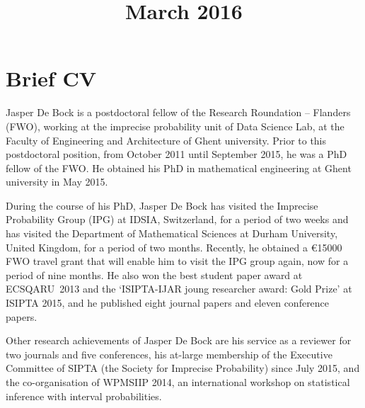 \documentclass[11pt,a4paper,roman]{moderncv}
\title{March 2016}  %
\begin{document}
\renewcommand*{\cventry}[6]{%
  \cvline{#1}{%
    {\scshape#2}%
    \ifx#3\else{, {\slshape#3}}\fi%
    \ifx#4\else{, #4}\fi%
    \ifx#5\else{, #5}\fi%
    .%
    \ifx#6\else{\newline{}\begin{minipage}[t]{\linewidth}\small#6\end{minipage}}\fi
}}%


\maketitle

\vspace{-55pt}

\section{Brief CV}
\vspace{4pt}

Jasper De Bock is a postdoctoral fellow of the Research Roundation -- Flanders (FWO), working at the imprecise probability unit of Data Science Lab, at the Faculty of Engineering and Architecture of Ghent university. Prior to this postdoctoral position, from October 2011 until September 2015, he was a PhD fellow of the FWO. He obtained his PhD in mathematical engineering at Ghent university in May 2015.

\hspace{17pt}During the course of his PhD, Jasper De Bock has visited the Imprecise Probability Group (IPG) at IDSIA, Switzerland, for a period of two weeks and has visited the Department of Mathematical Sciences at Durham University, United Kingdom, for a period of two months. Recently, he obtained a \euro{}15000 FWO travel grant that will enable him to visit the IPG group again, now for a period of nine months. He also won the best student paper award at ECSQARU~2013 and the `ISIPTA-IJAR joung researcher award: Gold Prize' at ISIPTA 2015, and he published eight journal papers and eleven conference papers.

\hspace{17pt}Other research achievements of Jasper De Bock are his service as a reviewer for two journals and five conferences, his at-large membership of the Executive Committee of SIPTA (the Society for Imprecise Probability) since July 2015, and the co-organisation of WPMSIIP 2014, an international workshop on statistical inference with interval probabilities.
\end{document}

